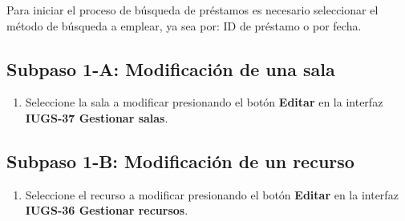 Para iniciar el proceso de búsqueda de préstamos es necesario seleccionar el método de 
búsqueda a emplear, ya sea por: ID de préstamo o por fecha.

\subsection{Subpaso 1-A: Modificación de una sala}
\begin{enumerate}
	\item Seleccione la sala a modificar presionando el botón \textbf{Editar} en la interfaz \textbf{IUGS-37 Gestionar salas}.
\end{enumerate}

\subsection{Subpaso 1-B: Modificación de un recurso}
\begin{enumerate}
	\item Seleccione el recurso a modificar presionando el botón \textbf{Editar} en la interfaz \textbf{IUGS-36 Gestionar recursos}.
\end{enumerate}

